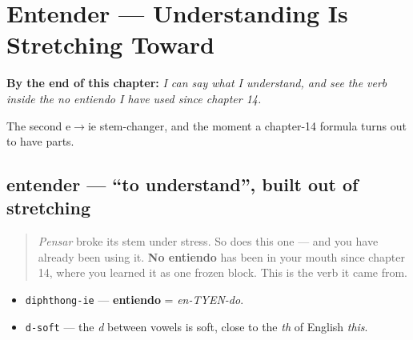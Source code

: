 
\chapter{Entender — Understanding Is Stretching Toward}
\label{ch:spanish-entender}

\begin{chapteropening}
\textbf{By the end of this chapter:} \emph{I can say what I understand, and see the verb inside the no entiendo I have used since chapter 14.}

The second e$\to$ie stem-changer, and the moment a chapter-14 formula turns out to have parts.
\end{chapteropening}

\section[entender]{entender — \textquotedblleft{}to understand\textquotedblright{}, built out of stretching}

\label{lesson:ES-C34-entender}



\begin{quote}
\emph{Pensar} broke its stem under stress. So does this one — and you have already been using it. \textbf{No entiendo} has been in your mouth since chapter 14, where you learned it as one frozen block. This is the verb it came from.
\end{quote}

\begin{sounds}
\begin{itemize}
\raggedright
  \item \texttt{diphthong-ie} — \textbf{entiendo} = \emph{en-TYEN-do}.
  \item \texttt{d-soft} — the \emph{d} between vowels is soft, close to the \emph{th} of English \emph{this}.
\end{itemize}
\end{sounds}

